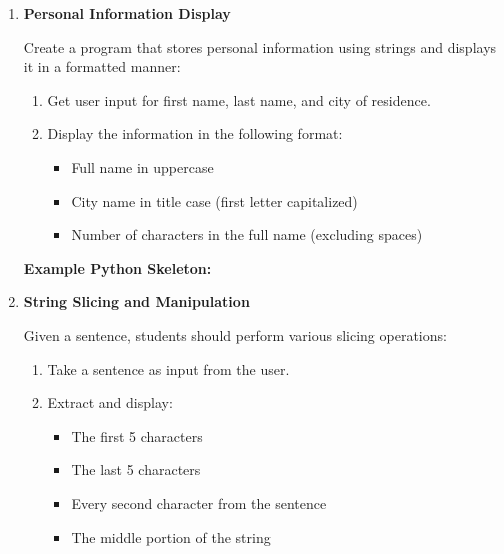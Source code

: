 \documentclass[a4paper,11pt]{article}
\theoremstyle{mytheor}
\begin{document}
\begin{enumerate}
    \item \textbf{Personal Information Display}  
    
    Create a program that stores personal information using strings and displays it in a formatted manner:
    \begin{enumerate} 
        \item Get user input for first name, last name, and city of residence.
        \item Display the information in the following format:
        \begin{itemize}
            \item Full name in uppercase
            \item City name in title case (first letter capitalized)
            \item Number of characters in the full name (excluding spaces)
        \end{itemize}
    \end{enumerate}
    
    \textbf{Example Python Skeleton:}




    
    \item \textbf{String Slicing and Manipulation}
    
    Given a sentence, students should perform various slicing operations:
    \begin{enumerate} 
        \item Take a sentence as input from the user.
        \item Extract and display:
        \begin{itemize}
            \item The first 5 characters
            \item The last 5 characters
            \item Every second character from the sentence
            \item The middle portion of the string
        \end{itemize}
    \end{enumerate}
    

\end{enumerate}
\end{document}

